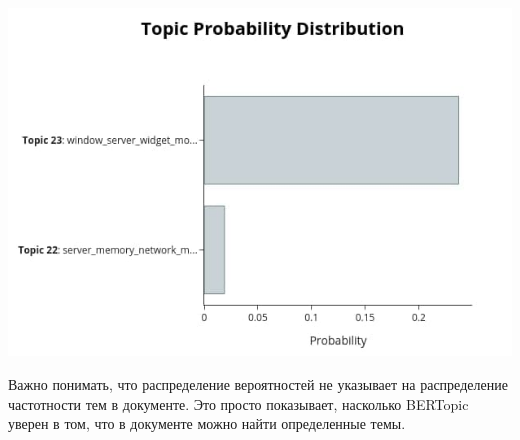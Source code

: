 \begin{center}
\includegraphics[scale=0.9]{pics/bertopic-visual-2.jpg}
\end{center}

Важно понимать, что распределение вероятностей не указывает на распределение частотности тем в документе. Это просто показывает, насколько BERTopic уверен в том, что в документе можно найти определенные темы.
